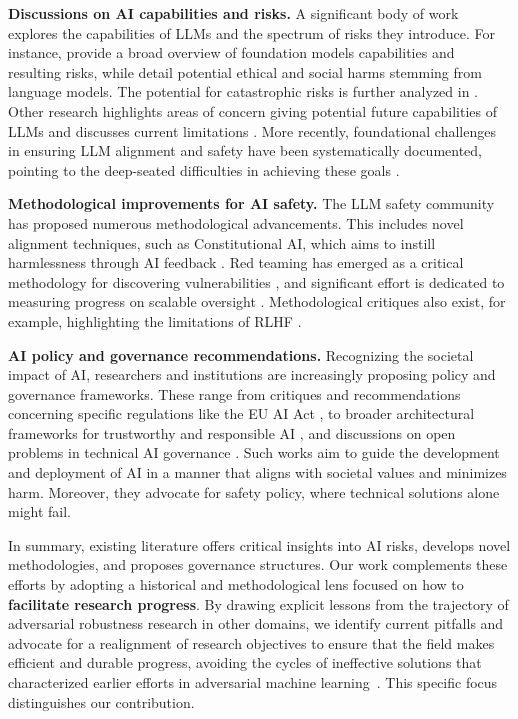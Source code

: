 \textbf{Discussions on AI capabilities and risks.} A significant body of work explores the capabilities of LLMs and the spectrum of risks they introduce. For instance, \citet{bommasani2021opportunities} provide a broad overview of foundation models capabilities and resulting risks, while \citet{weidinger2021ethical} detail potential ethical and social harms stemming from language models. The potential for catastrophic risks is further analyzed in \citet{hendrycks2023overview, shevlane2023model}. Other research highlights areas of concern giving potential future capabilities of LLMs and discusses current limitations \cite{srivastava2022beyond}. More recently, foundational challenges in ensuring LLM alignment and safety have been systematically documented, pointing to the deep-seated difficulties in achieving these goals \cite{anwar2024foundational}.

\textbf{Methodological improvements for AI safety.} The LLM safety community has proposed numerous methodological advancements. This includes novel alignment techniques, such as Constitutional AI, which aims to instill harmlessness through AI feedback \cite{bai2022constitutional}. Red teaming has emerged as a critical methodology for discovering vulnerabilities \cite{ganguli2022red, casper2023explore}, and significant effort is dedicated to measuring progress on scalable oversight \cite{bowman2022measuring}. Methodological critiques also exist, for example, highlighting the limitations of RLHF \cite{casper2023open}. 

\textbf{AI policy and governance recommendations.} Recognizing the societal impact of AI, researchers and institutions are increasingly proposing policy and governance frameworks. These range from critiques and recommendations concerning specific regulations like the EU AI Act \cite{sillberg2024eu}, to broader architectural frameworks for trustworthy and responsible AI \cite{chen2024trustworthy}, and discussions on open problems in technical AI governance \cite{reuel2024open}. Such works aim to guide the development and deployment of AI in a manner that aligns with societal values and minimizes harm. Moreover, they advocate for safety policy, where technical solutions alone might fail. 

In summary, existing literature offers critical insights into AI risks, develops novel methodologies, and proposes governance structures. Our work complements these efforts by adopting a historical and methodological lens focused on how to \textbf{facilitate research progress}. By drawing explicit lessons from the trajectory of adversarial robustness research in other domains, we identify current pitfalls and advocate for a realignment of research objectives to ensure that the field makes efficient and durable progress, avoiding the cycles of ineffective solutions that characterized earlier efforts in adversarial machine learning~\cite{madry_towards_2018, athalye_obfuscated_2018, tramer_adaptive_2020, schwinn2023adversarial}. This specific focus distinguishes our contribution.

